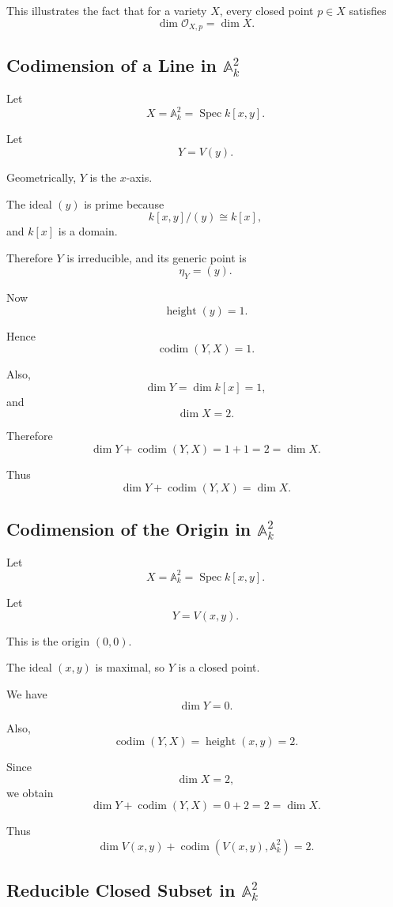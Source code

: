 \documentclass[12pt,a4paper]{article}
\theoremstyle{notespace}
\begin{document}
This illustrates the fact that for a variety \(X\), every closed point \(p\in X\) satisfies
\[
\dim \mathcal O_{X,p}=\dim X.
\]

\subsection{Codimension of a Line in \(\mathbb A^2_k\)}

Let
\[
X=\mathbb A^2_k=\operatorname{Spec} k[x,y].
\]

Let
\[
Y=V(y).
\]

Geometrically, \(Y\) is the \(x\)-axis.

The ideal \((y)\) is prime because
\[
k[x,y]/(y)\cong k[x],
\]
and \(k[x]\) is a domain.

Therefore \(Y\) is irreducible, and its generic point is
\[
\eta_Y=(y).
\]

Now
\[
\operatorname{height}(y)=1.
\]

Hence
\[
\operatorname{codim}(Y,X)=1.
\]

Also,
\[
\dim Y=\dim k[x]=1,
\]
and
\[
\dim X=2.
\]

Therefore
\[
\dim Y+\operatorname{codim}(Y,X)
=
1+1
=
2
=
\dim X.
\]

Thus
\[
\boxed{\dim Y+\operatorname{codim}(Y,X)=\dim X.}
\]

\subsection{Codimension of the Origin in \(\mathbb A^2_k\)}

Let
\[
X=\mathbb A^2_k=\operatorname{Spec} k[x,y].
\]

Let
\[
Y=V(x,y).
\]

This is the origin \((0,0)\).

The ideal \((x,y)\) is maximal, so \(Y\) is a closed point.

We have
\[
\dim Y=0.
\]

Also,
\[
\operatorname{codim}(Y,X)
=
\operatorname{height}(x,y)
=
2.
\]

Since
\[
\dim X=2,
\]
we obtain
\[
\dim Y+\operatorname{codim}(Y,X)
=
0+2
=
2
=
\dim X.
\]

Thus
\[
\boxed{\dim V(x,y)+\operatorname{codim}(V(x,y),\mathbb A^2_k)=2.}
\]

\subsection{Reducible Closed Subset in \(\mathbb A^2_k\)}
\end{document}
